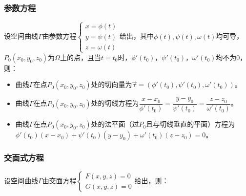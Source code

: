\paragraph{}

\subsubsection{参数方程}

设空间曲线$\varGamma$由参数方程$\left\{\begin{array}{l}
    x=\phi(t) \\
    y=\psi(t) \\
    z=\omega(t)
\end{array}\right.$给出，其中$\phi(t),\psi(t),\omega(t)$均可导，$P_0(x_0,y_0,z_0)$为$\varOmega$上的点，且当$t=t_0$时，$\phi'(t_0)$，$\psi'(t_0)$，$\omega'(t_0)$均不为0，则：

\begin{itemize}
    \item 曲线$\varGamma$在点$P_0(x_0,y_0,z_0)$处的切向量为$\vec{\tau}=(\phi'(t_0),\psi'(t_0),\omega'(t_0))$。
    \item 曲线$\varGamma$在点$P_0(x_0,y_0,z_0)$处的切线方程为$\dfrac{x-x_0}{\phi'(t_0)}=\dfrac{y-y_0}{\psi'(t_0)}=\dfrac{z-z_0}{\omega'(t_0)}$。
    \item 曲线$\varGamma$在点$P_0(x_0,y_0,z_0)$处的法平面（过$P_0$且与切线垂直的平面）方程为$\phi'(t_0)(x-x_0)+\psi'(t_0)(y-y_0)+\omega'(t_0)(z-z_0)=0$。
\end{itemize}

\subsubsection{交面式方程}

设空间曲线$\varGamma$由交面方程$\left\{\begin{array}{l}
    F(x,y,z)=0 \\
    G(x,y,z)=0
\end{array}\right.$给出，则：

